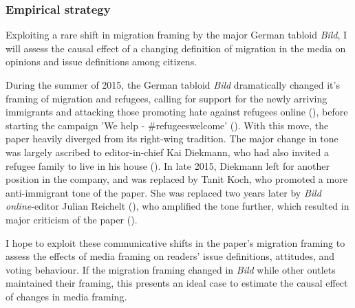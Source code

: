 \documentclass{article}
\begin{document}
\subsubsection{Empirical strategy}



Exploiting a rare shift in migration framing by the major German tabloid \textit{Bild}, I will assess the causal effect of a changing definition of migration in the media on opinions and issue definitions among citizens. 

During the summer of 2015, the German tabloid \textit{Bild} dramatically changed it's framing of migration and refugees, calling for support for the newly arriving immigrants and attacking those promoting hate against refugees online (\cite{Bild2015Pranger, TagesspiegelBildPranger}), before starting the campaign 'We help - \#refugeeswelcome' (\cite{BildRefugeesWelcome}). With this move, the paper heavily diverged from its right-wing tradition. The major change in tone was largely ascribed to editor-in-chief Kai Diekmann, who had also invited a refugee family to live in his house (\cite{BR2015Diekmann}). In late 2015, Diekmann left for another position in the company, and was replaced by Tanit Koch, who promoted a more anti-immigrant tone of the paper. She was replaced two years later by \textit{Bild online}-editor Julian Reichelt (\cite{Spiegel2018Koch}), who amplified the tone further, which resulted in major criticism of the paper (\cite{Niggemeyer2018Bild, DLF2018Reichelt}).


I hope to exploit these communicative shifts in the paper's migration framing to assess the effects of media framing on readers' issue definitions, attitudes, and voting behaviour. If the migration framing changed in \textit{Bild} while other outlets maintained their framing, this presents an ideal case to estimate the causal effect of changes in media framing.

\end{document}
